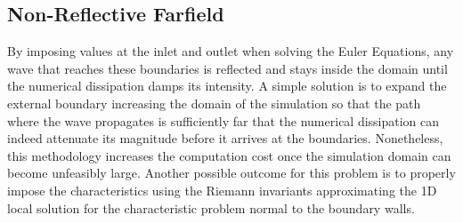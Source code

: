 \subsection{Non-Reflective Farfield}
By imposing values at the inlet and outlet when solving the Euler Equations, any wave that reaches these boundaries is reflected and stays inside the domain until the numerical dissipation damps its intensity. A simple solution is to expand the external boundary increasing the domain of the simulation so that the path where the wave propagates is sufficiently far that the numerical dissipation can indeed attenuate its magnitude before it arrives at the boundaries. Nonetheless, this methodology increases the computation cost once the simulation domain can become unfeasibly large. Another possible outcome for this problem is to properly impose the characteristics using the Riemann invariants approximating the 1D local solution for the characteristic problem normal to the boundary walls.

